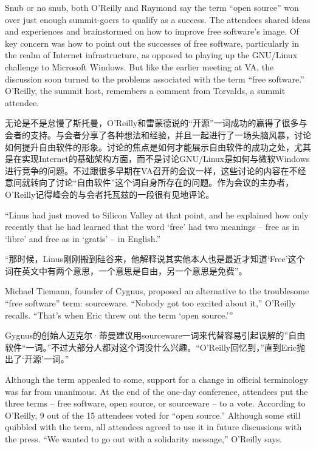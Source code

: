 \ifdefined\eng
Snub or no snub, both O'Reilly and Raymond say the term ``open source'' won over just enough summit-goers to qualify as a success. The attendees shared ideas and experiences and brainstormed on how to improve free software's image. Of key concern was how to point out the successes of free software, particularly in the realm of Internet infrastructure, as opposed to playing up the GNU/Linux challenge to Microsoft Windows. But like the earlier meeting at VA, the discussion soon turned to the problems associated with the term ``free software.'' O'Reilly, the summit host, remembers a comment from Torvalds, a summit attendee.
\fi

\ifdefined\chs
无论是不是怠慢了斯托曼，O'Reilly和雷蒙德说的“开源”一词成功的赢得了很多与会者的支持。与会者分享了各种想法和经验，并且一起进行了一场头脑风暴，讨论如何提升自由软件的形象。讨论的焦点是如何才能展示自由软件的成功之处，尤其是在实现Internet的基础架构方面，而不是讨论GNU/Linux是如何与微软Windows进行竞争的问题。不过跟很多早期在VA召开的会议一样，这些讨论的内容在不经意间就转向了讨论“自由软件”这个词自身所存在的问题。作为会议的主办者，O'Reilly记得峰会的与会者托瓦兹的一段很有见地评论。
\fi

\ifdefined\eng
``Linus had just moved to Silicon Valley at that point, and he explained how only recently that he had learned that the word `free' had two meanings -- free as in `libre' and free as in `gratis' -- in English.''
\fi

\ifdefined\chs
“那时候，Linus刚刚搬到硅谷来，他解释说其实他本人也是最近才知道‘Free’这个词在英文中有两个意思，一个意思是自由，另一个意思是免费”。
\fi

\ifdefined\eng
Michael Tiemann, founder of Cygnus, proposed an alternative to the troublesome ``free software'' term: sourceware. ``Nobody got too excited about it,'' O'Reilly recalls. ``That's when Eric threw out the term `open source.'\hspace{0.01in}''
\fi

\ifdefined\chs
Gygnus的创始人迈克尔·蒂曼建议用sourceware一词来代替容易引起误解的”自由软件“一词。”不过大部分人都对这个词没什么兴趣。“O'Reilly回忆到，”直到Eric抛出了‘开源’一词。”
\fi

\ifdefined\eng
Although the term appealed to some, support for a change in official terminology was far from unanimous. At the end of the one-day conference, attendees put the three terms -- free software, open source, or sourceware -- to a vote. According to O'Reilly, 9 out of the 15 attendees voted for ``open source.'' Although some still quibbled with the term, all attendees agreed to use it in future discussions with the press. ``We wanted to go out with a solidarity message,'' O'Reilly says.
\fi

